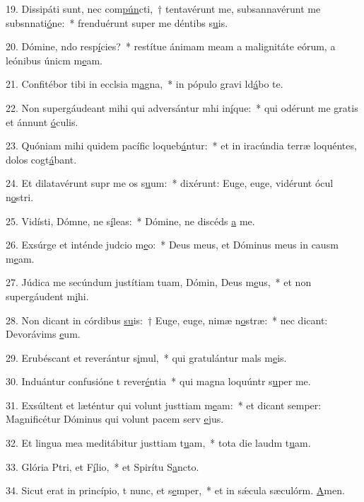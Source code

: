 19. Dissipáti sunt, nec com\uline{pún}cti,~† tentavérunt me, subsannavérunt me subsnnati\uline{ó}ne:~* frenduérunt super me déntibs s\uline{u}is.\par 
20. Dómine, ndo resp\uline{í}cies?~* restítue ánimam meam a malignitáte eórum, a leónibus únicm m\uline{e}am.\par 
21. Confitébor tibi in ecclsia m\uline{a}gna,~* in pópulo gravi ld\uline{á}bo te.\par 
22. Non supergáudeant mihi qui adversántur mhi in\uline{í}que:~* qui odérunt me gratis et ánnunt \uline{ó}culis.\par 
23. Quóniam mihi quidem pacífic loqueb\uline{á}ntur:~* et in iracúndia terræ loquéntes, dolos cogt\uline{á}bant.\par 
24. Et dilatavérunt supr me os s\uline{u}um:~* dixérunt: Euge, euge, vidérunt ócul n\uline{o}stri.\par 
25. Vidísti, Dómne, ne s\uline{í}leas:~* Dómine, ne discéds \uline{a} me.\par 
26. Exsúrge et inténde judcio m\uline{e}o:~* Deus meus, et Dóminus meus in causm m\uline{e}am.\par 
27. Júdica me secúndum justítiam tuam, Dómin, Deus m\uline{e}us,~* et non supergáudent m\uline{i}hi.\par 
28. Non dicant in córdibus \uline{su}is:~† Euge, euge, nimæ n\uline{o}stræ:~* nec dicant: Devorávims \uline{e}um.\par 
29. Erubéscant et reverántur s\uline{i}mul,~* qui gratulántur mals m\uline{e}is.\par 
30. Induántur confusióne t rever\uline{é}ntia~* qui magna loquúntr s\uline{u}per me.\par 
31. Exsúltent et læténtur qui volunt justtiam m\uline{e}am:~* et dicant semper: Magnificétur Dóminus qui volunt pacem serv \uline{e}jus.\par 
32. Et lingua mea meditábitur justtiam t\uline{u}am,~* tota die laudm t\uline{u}am.\par 
33. Glória Ptri, et F\uline{í}lio,~* et Spirítu S\uline{a}ncto.\par 
34. Sicut erat in princípio, t nunc, et s\uline{e}mper,~* et in sǽcula sæculórm. \uline{A}men.\par 
